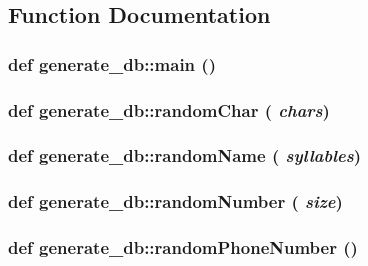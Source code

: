 \subsection{Function Documentation}
\hypertarget{namespacegenerate__db_9cd177ba24ef31178b1e8769ea59a00c}{
\subsubsection[{main}]{\setlength{\rightskip}{0pt plus 5cm}def generate\_\-db::main ()}}
\label{namespacegenerate__db_9cd177ba24ef31178b1e8769ea59a00c}


\hypertarget{namespacegenerate__db_eadd9c3802da642d0ce75635f4541cd2}{
\subsubsection[{randomChar}]{\setlength{\rightskip}{0pt plus 5cm}def generate\_\-db::randomChar ( {\em chars})}}
\label{namespacegenerate__db_eadd9c3802da642d0ce75635f4541cd2}


\hypertarget{namespacegenerate__db_5a79efa0019ee6a80d9b806adbfb2105}{
\subsubsection[{randomName}]{\setlength{\rightskip}{0pt plus 5cm}def generate\_\-db::randomName ( {\em syllables})}}
\label{namespacegenerate__db_5a79efa0019ee6a80d9b806adbfb2105}


\hypertarget{namespacegenerate__db_30086626c62e40f2983024f5d68e718e}{
\subsubsection[{randomNumber}]{\setlength{\rightskip}{0pt plus 5cm}def generate\_\-db::randomNumber ( {\em size})}}
\label{namespacegenerate__db_30086626c62e40f2983024f5d68e718e}


\hypertarget{namespacegenerate__db_d0786a358625e83c545ab36b0ef523aa}{
\subsubsection[{randomPhoneNumber}]{\setlength{\rightskip}{0pt plus 5cm}def generate\_\-db::randomPhoneNumber ()}}
\label{namespacegenerate__db_d0786a358625e83c545ab36b0ef523aa}


